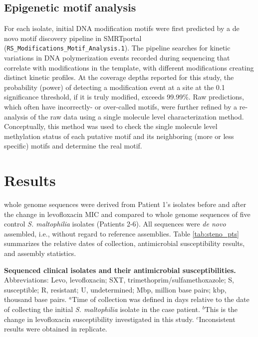 \subsection{Epigenetic motif analysis}

For each isolate, initial DNA modification motifs were first predicted by a de novo motif discovery pipeline in SMRTportal (\texttt{RS\_Modifications\_Motif\_Analysis.1}). The pipeline searches for kinetic variations in DNA polymerization events recorded during sequencing that correlate with modifications in the template, with different modifications creating distinct kinetic profiles.\autocite{Clark2012,Fang2012} At the coverage depths reported for this study, the probability (power) of detecting a modification event at a site at the 0.1 significance threshold, if it is truly modified, exceeds 99.99\%.\autocite{Fang2012} Raw predictions, which often have incorrectly- or over-called motifs, were further refined by a re-analysis of the raw data using a single molecule level characterization method.\autocite{Beaulaurier2015} Conceptually, this method was used to check the single molecule level methylation status of each putative motif and its neighboring (more or less specific) motifs and determine the real motif. 

\section{Results}

 whole genome sequences were derived from Patient 1’s isolates before and after the change in levofloxacin MIC and compared to whole genome sequences of five control \emph{S. maltophilia} isolates (Patients 2-6). All sequences were \emph{de novo} assembled, i.e., without regard to reference assemblies. Table \ref{tab:steno_pts} summarizes the relative dates of collection, antimicrobial susceptibility results, and assembly statistics.

\begin{table*}[ht]
  
  \caption[Sequenced clinical isolates and their antimicrobial susceptibilities]{\textbf{Sequenced clinical isolates and their antimicrobial susceptibilities.} Abbreviations: Levo, levofloxacin; SXT, trimethoprim/sulfamethoxazole; S, susceptible; R, resistant; U, undetermined; Mbp, million base pairs; kbp, thousand base pairs. $^a$Time of collection was defined in days relative to the date of collecting the initial \emph{S. maltophilia} isolate in the case patient. $^b$This is the change in levofloxacin susceptibility investigated in this study. $^c$Inconsistent results were obtained in replicate.}
  \label{tab:steno_pts}
\end{table*}

